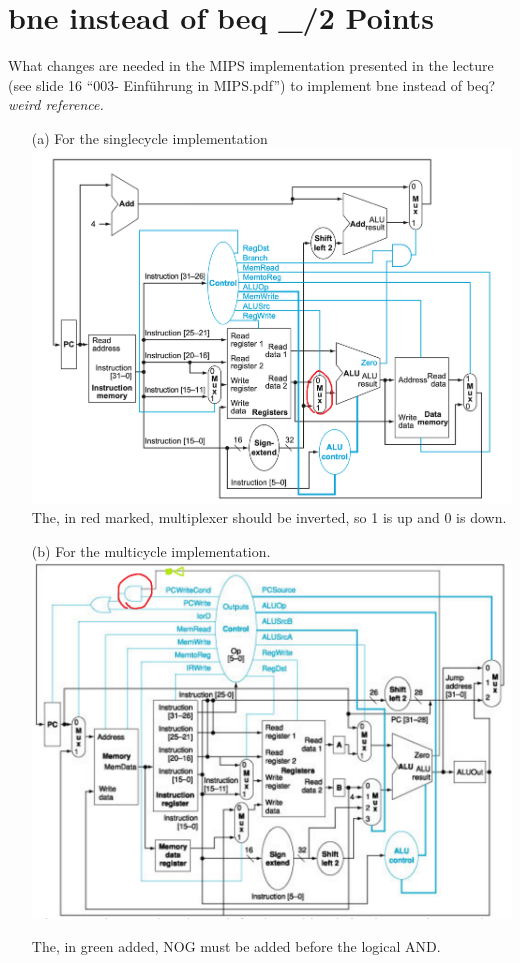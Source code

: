 \documentclass{article}
\begin{document}
\section{bne instead of beq \_/2 Points}
What changes are needed in the MIPS implementation presented in the lecture (see slide 16 “003-
Einführung in MIPS.pdf”) to implement bne instead of beq?\newline
\textit{weird reference.}
\begin{itemize}
\item[(a)] For the singlecycle implementation \newline
\includegraphics[width=\textwidth]{mipssinglecyclemarked.png}
The, in red marked, multiplexer should be inverted, so 1 is up and 0 is down.

\item[(b)] For the multicycle implementation. \newline
\includegraphics[width=\textwidth]{multycyclemarked.png}

The, in green added, NOG must be added before the logical AND.

\end{itemize}
\end{document}

